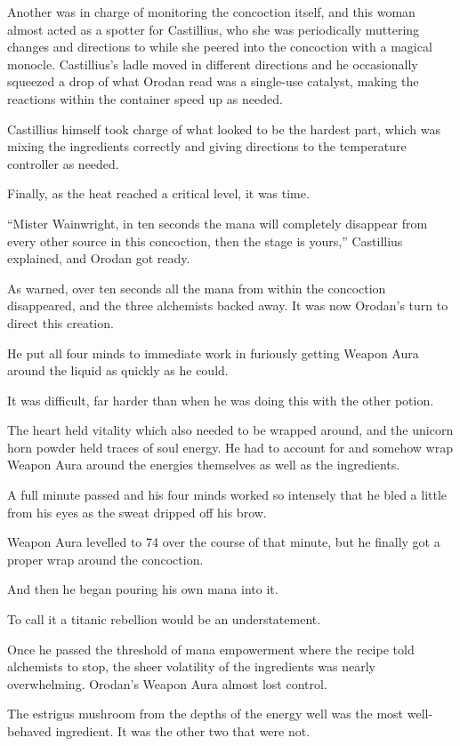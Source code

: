 \documentclass[a4paper,10pt]{book}
\begin{document}
Another was in charge of monitoring the concoction itself, and this woman almost acted as a spotter for Castillius, who she was periodically muttering changes and directions to while she peered into the concoction with a magical monocle. Castillius’s ladle moved in different directions and he occasionally squeezed a drop of what Orodan read was a single-use catalyst, making the reactions within the container speed up as needed.\par
Castillius himself took charge of what looked to be the hardest part, which was mixing the ingredients correctly and giving directions to the temperature controller as needed.\par
Finally, as the heat reached a critical level, it was time.\par
“Mister Wainwright, in ten seconds the mana will completely disappear from every other source in this concoction, then the stage is yours,” Castillius explained, and Orodan got ready.\par
As warned, over ten seconds all the mana from within the concoction disappeared, and the three alchemists backed away. It was now Orodan’s turn to direct this creation.\par
He put all four minds to immediate work in furiously getting Weapon Aura around the liquid as quickly as he could.\par
It was difficult, far harder than when he was doing this with the other potion.\par
The heart held vitality which also needed to be wrapped around, and the unicorn horn powder held traces of soul energy. He had to account for and somehow wrap Weapon Aura around the energies themselves as well as the ingredients.\par
A full minute passed and his four minds worked so intensely that he bled a little from his eyes as the sweat dripped off his brow.\par
Weapon Aura levelled to 74 over the course of that minute, but he finally got a proper wrap around the concoction.\par
And then he began pouring his own mana into it.\par
To call it a titanic rebellion would be an understatement.\par
Once he passed the threshold of mana empowerment where the recipe told alchemists to stop, the sheer volatility of the ingredients was nearly overwhelming. Orodan’s Weapon Aura almost lost control.\par
The estrigus mushroom from the depths of the energy well was the most well-behaved ingredient. It was the other two that were not.\par
\end{document}
